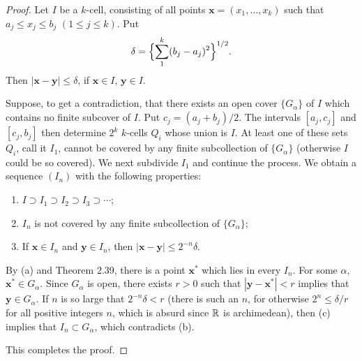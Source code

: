 \begin{proof}
Let $I$ be a $k$-cell, consisting of all points
$\mathbf{x} = (x_1,\dots,x_k)$ such that $a_j \le x_j \le b_j$
$(1 \le j \le k)$. Put
\[ \delta = \Bigl\{\sum_{1}^{k} (b_j-a_j)^2\Bigr\}^{1/2}. \]
Then $|\mathbf{x}-\mathbf{y}| \le \delta$, if $\mathbf{x} \in I$,
$\mathbf{y} \in I$.

Suppose, to get a contradiction, that there exists an open cover
$\{G_\alpha\}$ of $I$ which contains no finite subcover of $I$. Put
$c_j = (a_j+b_j)/2$. The intervals $[a_j,c_j]$ and $[c_j,b_j]$ then determine
$2^k$ $k$-cells $Q_i$ whose union is $I$. At least one of these sets $Q_i$,
call it $I_1$, cannot be covered by any finite subcollection of $\{G_\alpha\}$
(otherwise $I$ could be so covered). We next subdivide $I_1$ and continue the
process. We obtain a sequence $(I_n)$ with the following properties:
\begin{enumerate}[label=(\alph*), leftmargin=2.2em, itemsep=1pt, topsep=3pt]
  \item $I \supset I_1 \supset I_2 \supset I_3 \supset \cdots$;
  \item $I_n$ is not covered by any finite subcollection of $\{G_\alpha\}$;
  \item If $\mathbf{x} \in I_n$ and $\mathbf{y} \in I_n$, then
        $|\mathbf{x}-\mathbf{y}| \le 2^{-n}\delta$.
\end{enumerate}
By (a) and Theorem 2.39, there is a point $\mathbf{x}^*$ which lies in every
$I_n$. For some $\alpha$, $\mathbf{x}^* \in G_\alpha$. Since $G_\alpha$ is
open, there exists $r > 0$ such that $|\mathbf{y}-\mathbf{x}^*| < r$ implies
that $\mathbf{y} \in G_\alpha$. If $n$ is so large that $2^{-n}\delta < r$
(there is such an $n$, for otherwise $2^n \le \delta/r$ for all positive
integers $n$, which is absurd since $\mathbb{R}$ is archimedean), then (c) implies that
$I_n \subset G_\alpha$, which contradicts (b).

This completes the proof.
\end{proof}

